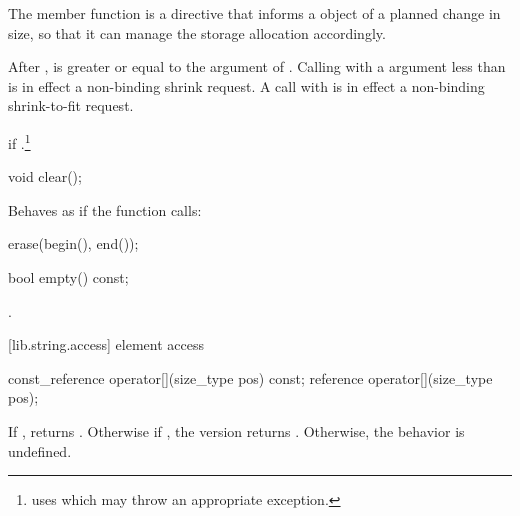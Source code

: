 \begin{itemdescr}
\pnum
The member function
is a directive that informs a
object of a planned change in size,
so that it can manage the storage allocation accordingly.

\pnum
\effects
After
,
is greater or equal to the argument of
.
\enternote
Calling
with a  argument less than
is in effect a non-binding shrink request.
A call with
is in effect a non-binding shrink-to-fit request.
\exitnoteb

\pnum
\throws
{}
if
.\footnote{
uses
which may throw an appropriate exception.}
\end{itemdescr}

%
%
\begin{itemdecl}
void clear();
\end{itemdecl}

\begin{itemdescr}
\pnum
\effects
Behaves as if the function calls:

\begin{codeblock}
erase(begin(), end());
\end{codeblock}
\end{itemdescr}

%
%
\begin{itemdecl}
bool empty() const;
\end{itemdecl}

\begin{itemdescr}
\pnum
\returns
{}.
\end{itemdescr}

[lib.string.access]{ element access}

%
%
\begin{itemdecl}
const_reference operator[](size_type pos) const;
reference       operator[](size_type pos);
\end{itemdecl}

\begin{itemdescr}
\pnum
\returns If , returns .
Otherwise if , the  version returns
. Otherwise, the behavior is undefined.
\end{itemdescr}

